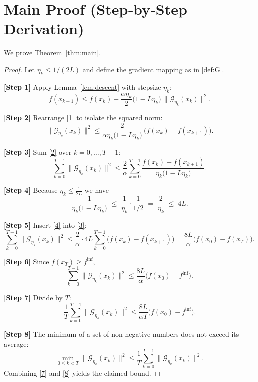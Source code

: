 \documentclass{article}
\begin{document}
\section*{Main Proof (Step‑by‑Step Derivation)}
We prove Theorem~\ref{thm:main}.

\begin{proof}
Let $\eta_{k}\le 1/(2L)$ and define the gradient mapping as in \eqref{def:G}.

\noindent\textbf{[Step 1]}  Apply Lemma~\ref{lem:descent} with stepsize $\eta_{k}$:
\[
f(x_{k+1})
\le f(x_{k})-\frac{\alpha\eta_{k}}{2}\bigl(1-L\eta_{k}\bigr)\,
\bigl\|\mathcal{G}_{\eta_{k}}(x_{k})\bigr\|^{2}.
\tag{1}
\]

\noindent\textbf{[Step 2]}  Rearrange \eqref{1} to isolate the squared norm:
\[
\bigl\|\mathcal{G}_{\eta_{k}}(x_{k})\bigr\|^{2}
\le
\frac{2}{\alpha\eta_{k}\bigl(1-L\eta_{k}\bigr)}\,
\bigl(f(x_{k})-f(x_{k+1})\bigr).
\tag{2}
\]

\noindent\textbf{[Step 3]}  Sum \eqref{2} over $k=0,\dots,T-1$:
\[
\sum_{k=0}^{T-1}\bigl\|\mathcal{G}_{\eta_{k}}(x_{k})\bigr\|^{2}
\le
\frac{2}{\alpha}\sum_{k=0}^{T-1}
\frac{f(x_{k})-f(x_{k+1})}{\eta_{k}\bigl(1-L\eta_{k}\bigr)}.
\tag{3}
\]

\noindent\textbf{[Step 4]}  Because $\eta_{k}\le \frac{1}{2L}$ we have
\[
\frac{1}{\eta_{k}\bigl(1-L\eta_{k}\bigr)}
\;\le\;
\frac{1}{\eta_{k}}\cdot\frac{1}{1/2}
\;=\;
\frac{2}{\eta_{k}}
\;\le\;
4L .
\tag{4}
\]

\noindent\textbf{[Step 5]}  Insert \eqref{4} into \eqref{3}:
\[
\sum_{k=0}^{T-1}\bigl\|\mathcal{G}_{\eta_{k}}(x_{k})\bigr\|^{2}
\le
\frac{2}{\alpha}\cdot 4L\sum_{k=0}^{T-1}\bigl(f(x_{k})-f(x_{k+1})\bigr)
=
\frac{8L}{\alpha}\bigl(f(x_{0})-f(x_{T})\bigr).
\tag{5}
\]

\noindent\textbf{[Step 6]}  Since $f(x_{T})\ge f^{\inf}$,
\[
\sum_{k=0}^{T-1}\bigl\|\mathcal{G}_{\eta_{k}}(x_{k})\bigr\|^{2}
\le
\frac{8L}{\alpha}\bigl(f(x_{0})-f^{\inf}\bigr).
\tag{6}
\]

\noindent\textbf{[Step 7]}  Divide by $T$:
\[
\frac{1}{T}\sum_{k=0}^{T-1}\bigl\|\mathcal{G}_{\eta_{k}}(x_{k})\bigr\|^{2}
\le
\frac{8L}{\alpha T}\bigl(f(x_{0})-f^{\inf}\bigr).
\tag{7}
\]

\noindent\textbf{[Step 8]}  The minimum of a set of non‑negative numbers does not exceed its average:
\[
\min_{0\le k<T}\bigl\|\mathcal{G}_{\eta_{k}}(x_{k})\bigr\|^{2}
\le
\frac{1}{T}\sum_{k=0}^{T-1}\bigl\|\mathcal{G}_{\eta_{k}}(x_{k})\bigr\|^{2}.
\tag{8}
\]
Combining \eqref{7} and \eqref{8} yields the claimed bound.
\end{proof}
\end{document}
